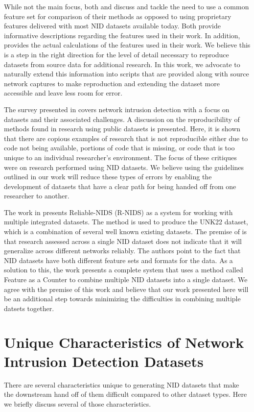 \documentclass[conference]{IEEEtran}
\begin{document}
While not the main focus, both \cite{e23111532} and \cite{layeghy2021} discuss and tackle the need to use a common feature set for comparison of their methods as opposed to using proprietary features delivered with most NID datasets available today.
Both provide informative descriptions regarding the features used in their work.
In addition, \cite{layeghy2021} provides the actual calculations of the features used in their work.
We believe this is a step in the right direction for the level of detail necessary to reproduce datasets from source data for additional research.
In this work, we advocate to naturally extend this information into scripts that are provided along with source network captures to make reproduction and extending the dataset more accessible and leave less room for error.

The survey presented in \cite{Chou2022} covers network intrusion detection with a focus on datasets and their associated challenges.
A discussion on the reproducibility of methods found in research using public datasets is presented.
Here, it is shown that there are copious examples of research that is not reproducible either due to code not being available, portions of code that is missing, or code that is too unique to an individual researcher's environment.
The focus of these critiques were on research performed using NID datasets.
We believe using the guidelines outlined in our work will reduce these types of errors by enabling the development of datasets that have a clear path for being handed off from one researcher to another.

The work in \cite{9787094} presents Reliable-NIDS (R-NIDS) as a system for working with multiple integrated datasets.
The method is used to produce the UNK22 dataset, which is a combination of several well known existing datasets.
The premise of \cite{9787094} is that research assessed across a single NID dataset does not indicate that it will generalize across different networks reliably.
The authors point to the fact that NID datasets have both different feature sets and formats for the data.
As a solution to this, the work presents a complete system that uses a method called Feature as a Counter to combine multiple NID datasets into a single dataset.
We agree with the premise of this work and believe that our work presented here will be an additional step towards minimizing the difficulties in combining multiple datsets together.

\section{Unique Characteristics of Network Intrusion Detection Datasets}\label{sec:characteristics}
There are several characteristics unique to generating NID  datasets that make the downstream hand off of them difficult compared to other dataset types.
Here we briefly discuss several of those characteristics.
\end{document}
